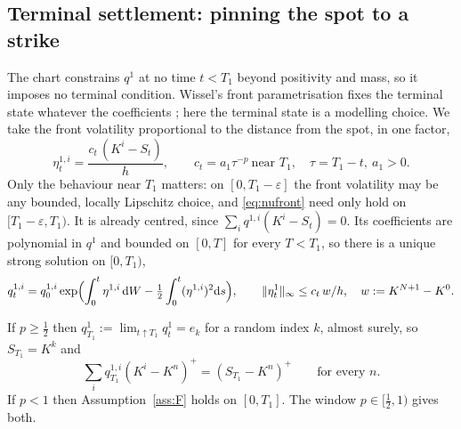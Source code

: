 \subsection{Terminal settlement: pinning the spot to a strike}\label{sec:nonpinning}

The chart constrains $q^1$ at no time $t<T_1$ beyond positivity and mass, so it imposes
no terminal condition. Wissel's front parametrisation fixes the terminal state whatever
the coefficients \cite{Wissel2007}; here the terminal state is a modelling choice. We take
the front volatility proportional to the distance from the spot, in one factor,
\begin{equation}\label{eq:nufront}
  \eta^{1,i}_{t}=\frac{c_t\,(K^i-S_t)}{h},\qquad c_t=a_1\tau^{-p}\ \text{near }T_1,
  \quad\tau=T_1-t,\ a_1>0 .
\end{equation}
Only the behaviour near $T_1$ matters: on $[0,T_1-\varepsilon]$ the front
volatility may be any bounded, locally Lipschitz choice, and \eqref{eq:nufront} need only
hold on $[T_1-\varepsilon,T_1)$. It is already centred, since $\sum_iq^{1,i}(K^i-S_t)=0$. Its coefficients are polynomial in
$q^1$ and bounded on $[0,T]$ for every $T<T_1$, so there is a unique strong solution
on $[0,T_1)$,
\begin{equation}\label{eq:frontexplicit}
  q^{1,i}_{t}=q^{1,i}_{0}\exp\Bigl(\int_0^t\eta^{1,i}\,\mathrm d W-\tfrac12\int_0^t(\eta^{1,i})^2\mathrm d s\Bigr),
  \qquad
  \lVert\eta^{1}_t\rVert_\infty\le c_t\,w/h,\quad w:=K^{N+1}-K^0 .
\end{equation}

\begin{proposition}\label{prop:collapse}
If $p\ge\tfrac12$ then $q^{1}_{T_1}:=\lim_{t\uparrow T_1}q^1_t=e_k$ for a random index $k$,
almost surely, so $S_{T_1}=K^k$ and
\begin{equation}\label{eq:settle}
  \sum_i q^{1,i}_{T_1}(K^i-K^n)^{+}=(S_{T_1}-K^n)^{+}\qquad\text{for every }n .
\end{equation}
If $p<1$ then Assumption~\ref{ass:F} holds on $[0,T_1]$. The window $p\in[\tfrac12,1)$ gives both.
\end{proposition}

